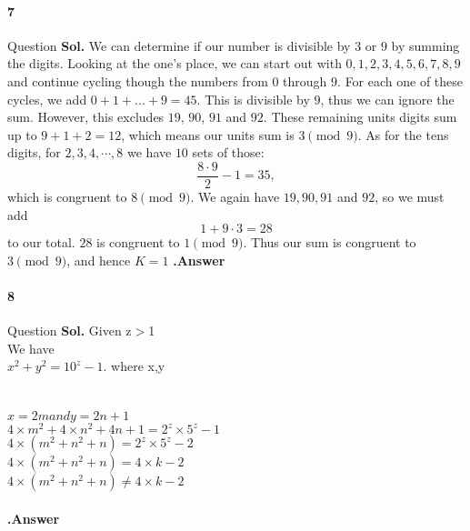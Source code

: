 \documentclass[12pt]{amsart}
\begin{document}
\paragraph*{7} Question
\bigskip
\textbf{Sol.}  We can determine if our number is divisible by $3$ or $9$ by summing the digits. Looking at the one's place, we can start out with $0, 1, 2, 3, 4, 5, 6, 7, 8, 9$ and continue cycling though the numbers from $0$ through $9$. For each one of these cycles, we add $0 + 1 + ... + 9 = 45$. This is divisible by $9$, thus we can ignore the sum. However, this excludes $19$, $90$, $91$ and $92$. These remaining units digits sum up to $9 + 1 + 2 = 12$, which means our units sum is $3 \pmod 9$. As for the tens digits, for $2, 3, 4, \cdots , 8$ we have $10$ sets of those:\[\frac{8 \cdot 9}{2} - 1 = 35,\]which is congruent to $8 \pmod 9$. We again have $19, 90, 91$ and $92$, so we must add\[1 + 9 \cdot 3 = 28\]to our total. $28$ is congruent to $1 \pmod 9$. Thus our sum is congruent to $3 \pmod 9$, and hence $K=1$ \textbf{.Answer}


\paragraph*{8} Question
\bigskip
\textbf{Sol.} 
Given z$>$1
\\We have\\
$x^{2} + y^{2}=10^{z} - 1.$
where x,y \in {}  \\
\\
\\ 
$x=2m and y=2n+1$  \in {}\\
\implies $4\times m^{2} + 4\times n^{2} + 4n + 1= 2^{z}\times5^{z} - 1$ \\
\implies $4\times (m^{2} + n^{2} + n )= 2^{z}\times5^{z} - 2$ \\
\implies $4\times (m^{2} + n^{2} + n )= 4\times k - 2$ \in {}\\
\implies $4\times (m^{2} + n^{2} + n ) \not = 4\times k - 2$ \\
\\  \textbf{.Answer}
\end{document}
